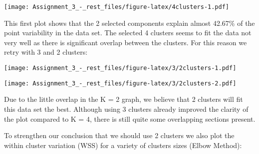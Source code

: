 \documentclass[]{article}
\newenvironment{Shaded}{\begin{snugshade}}{\end{snugshade}}
\newcommand{\KeywordTok}[1]{\textcolor[rgb]{0.13,0.29,0.53}{\textbf{#1}}}
\newcommand{\DataTypeTok}[1]{\textcolor[rgb]{0.13,0.29,0.53}{#1}}
\newcommand{\DecValTok}[1]{\textcolor[rgb]{0.00,0.00,0.81}{#1}}
\newcommand{\StringTok}[1]{\textcolor[rgb]{0.31,0.60,0.02}{#1}}
\newcommand{\CommentTok}[1]{\textcolor[rgb]{0.56,0.35,0.01}{\textit{#1}}}
\newcommand{\OtherTok}[1]{\textcolor[rgb]{0.56,0.35,0.01}{#1}}
\newcommand{\OperatorTok}[1]{\textcolor[rgb]{0.81,0.36,0.00}{\textbf{#1}}}
\newcommand{\NormalTok}[1]{#1}
\begin{document}
\texttt{[image: Assignment\_3\_-\_rest\_files/figure-latex/4clusters-1.pdf]}

This first plot shows that the 2 selected components explain almost
42.67\% of the point variability in the data set. The selected 4
clusters seems to fit the data not very well as there is significant
overlap between the clusters. For this reason we retry with 3 and 2
clusters:

\begin{Shaded}
\end{Shaded}

\texttt{[image: Assignment\_3\_-\_rest\_files/figure-latex/3/2clusters-1.pdf]}

\begin{Shaded}
\end{Shaded}

\texttt{[image: Assignment\_3\_-\_rest\_files/figure-latex/3/2clusters-2.pdf]}

Due to the little overlap in the K = 2 graph, we believe that 2 clusters
will fit this data set the best. Although using 3 clusters already
improved the clarity of the plot compared to K = 4, there is still quite
some overlapping sections present.

To strengthen our conclusion that we should use 2 clusters we also plot
the within cluster variation (WSS) for a variety of clusters sizes
(Elbow Method):
\end{document}
